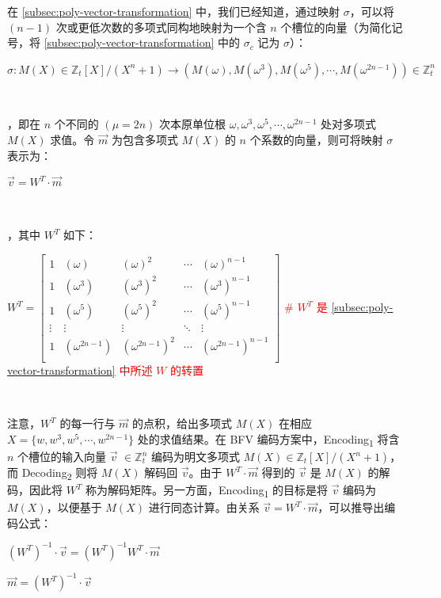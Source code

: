 在 \autoref{subsec:poly-vector-transformation} 中，我们已经知道，通过映射 $\sigma$，可以将 $(n-1)$ 次或更低次数的多项式同构地映射为一个含 $n$ 个槽位的向量（为简化记号，将 \autoref{subsec:poly-vector-transformation} 中的 $\sigma_c$ 记为 $\sigma$）：

$\sigma: M(X) \in \mathbb{Z}_t[X]/(X^n + 1) \longrightarrow  (M(\omega),M(\omega^3),M(\omega^5), \cdots, M(\omega^{2n-1})) \in \mathbb{Z}_t^n$

$ $

，即在 $n$ 个不同的 $(\mu=2n)$ 次本原单位根 $\omega, \omega^3, \omega^5, \cdots, \omega^{2n-1}$ 处对多项式 $M(X)$ 求值。令 $\vec{m}$ 为包含多项式 $M(X)$ 的 $n$ 个系数的向量，则可将映射 $\sigma$ 表示为：

$\vec{v} = W^T \cdot \vec{m}$

$ $

，其中 $W^T$ 如下：

$W^T = \begin{bmatrix}
1 & (\omega) & (\omega)^2 & \cdots & (\omega)^{n-1}\\
1 & (\omega^3) & (\omega^3)^2 & \cdots & (\omega^3)^{n-1}\\
1 & (\omega^5) & (\omega^5)^2 & \cdots & (\omega^5)^{n-1}\\
\vdots & \vdots & \vdots & \ddots & \vdots \\
1 & (\omega^{2n-1}) & (\omega^{2n-1})^2 & \cdots & (\omega^{2n-1})^{n-1}\\
\end{bmatrix}$  \textcolor{red}{ \text{ } \# $W^T$ 是 \autoref{subsec:poly-vector-transformation} 中所述 $W$ 的转置}

$ $

注意，$W^T$ 的每一行与 $\vec{m}$ 的点积，给出多项式 $M(X)$ 在相应 $X = \{w, w^3, w^5, \cdots, w^{2n-1}\}$ 处的求值结果。在 BFV 编码方案中，\textsf{Encoding\textsubscript{1}} 将含 $n$ 个槽位的输入向量 $\vec{v}$ $\in \mathbb{Z}_t^n$ 编码为明文多项式 $M(X) \in \mathbb{Z}_t[X] / (X^n + 1)$，而 \textsf{Decoding\textsubscript{2}} 则将 $M(X)$ 解码回 $\vec{v}$。由于 $W^T \cdot \vec{m}$ 得到的 $\vec{v}$ 是 $M(X)$ 的解码，因此将 $W^T$ 称为解码矩阵。另一方面，\textsf{Encoding\textsubscript{1}} 的目标是将 $\vec{v}$ 编码为 $M(X)$，以便基于 $M(X)$ 进行同态计算。由关系 $\vec{v} = W^T \cdot \vec{m}$，可以推导出编码公式：

$(W^T)^{-1} \cdot \vec{v} = (W^T)^{-1} W^T \cdot \vec{m}$

$\vec{m} = (W^T)^{-1} \cdot \vec{v}$

$ $

